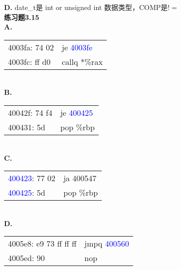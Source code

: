 \documentclass{article}
\newcommand{\blue}[1]{\textcolor{blue}{#1}}
\begin{document}
\begin{CJK}{UTF8}{uyhei}
\textbf{D.} date\_t是 int or unsigned int 数据类型，COMP是$!=$	\\[3ex]
\textbf{练习题3.15}	\\[2ex]
\textbf{A.}	\\[-3ex]
\begin{table}[htbp]
\begin{tabular}{m{10em}m{10em}}
4003fa: 74 02	&	je \blue{4003fe}	\\
4003fc: ff d0	&	callq *\%rax	\\
\end{tabular}
\end{table}	\\
\newpage
\noindent\textbf{B.} 	\\[-3ex]
\begin{table}[htbp]
\begin{tabular}{m{10em}m{10em}}
40042f: 74 f4	&	je \blue{400425}	\\
400431: 5d	&	pop \%rbp	\\
\end{tabular}
\end{table}	\\
\textbf{C.} 	\\[-3ex]
\begin{table}[htbp]
\begin{tabular}{m{10em}m{10em}}
\blue{400423}: 77 02	&	ja 400547	\\
\blue{400425}: 5d	&	pop \%rbp	\\
\end{tabular}
\end{table}	\\
\textbf{D.} 	\\[-3ex]
\begin{table}[htbp]
\begin{tabular}{m{10em}m{10em}}
4005e8: e9 73 ff ff ff	&	jmpq \blue{400560}	\\
4005ed: 90	&	nop 	\\
\end{tabular}
\end{table}	\\





\end{CJK}
\end{document}
